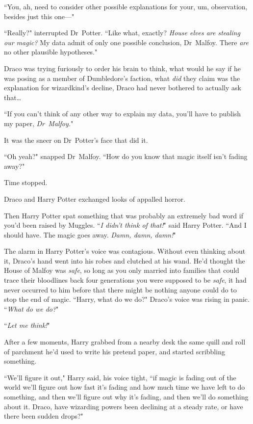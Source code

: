 ``You, ah, need to consider other possible explanations for your, um, observation, besides just this one—"

``Really?" interrupted Dr~Potter. ``Like what, exactly? \emph{House elves are stealing our magic?} My data admit of only one possible conclusion, Dr~Malfoy. There \emph{are} no other plausible hypotheses."

Draco was trying furiously to order his brain to think, what would he say if he was posing as a member of Dumbledore's faction, what \emph{did} they claim was the explanation for wizardkind's decline, Draco had never bothered to actually ask that{\ldots}

``If you can't think of any other way to explain my data, you'll have to publish my paper, \emph{Dr~Malfoy.}"

It was the sneer on Dr~Potter's face that did it.

``Oh yeah?" snapped Dr~Malfoy. ``How do you know that magic itself isn't fading away?"

Time stopped.

Draco and Harry Potter exchanged looks of appalled horror.

Then Harry Potter spat something that was probably an extremely bad word if you'd been raised by Muggles. ``\emph{I didn't think of that!}" said Harry Potter. ``And I should have. The magic goes away. \emph{Damn, damn, damn!}"

The alarm in Harry Potter's voice was contagious. Without even thinking about it, Draco's hand went into his robes and clutched at his wand. He'd thought the House of Malfoy was \emph{safe}, so long as you only married into families that could trace their bloodlines back four generations you were supposed to be \emph{safe}, it had never occurred to him before that there might be nothing anyone could do to stop the end of magic. ``Harry, what do we do?" Draco's voice was rising in panic. ``\emph{What do we do?}"

``\emph{Let me think!}"

After a few moments, Harry grabbed from a nearby desk the same quill and roll of parchment he'd used to write his pretend paper, and started scribbling something.

``We'll figure it out," Harry said, his voice tight, ``if magic is fading out of the world we'll figure out how fast it's fading and how much time we have left to do something, and then we'll figure out why it's fading, and then we'll do something about it. Draco, have wizarding powers been declining at a steady rate, or have there been sudden drops?"

